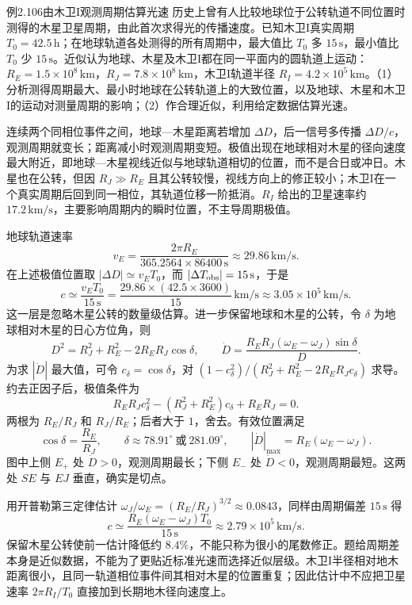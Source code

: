 \KinematicKeepSpace{14cm}
\begin{origexamplebox}{例2.106\quad 由木卫I观测周期估算光速}
历史上曾有人比较地球位于公转轨道不同位置时测得的木星卫星周期，由此首次求得光的传播速度。已知木卫I真实周期 $T_0=42.5\,\mathrm h$；在地球轨道各处测得的所有周期中，最大值比 $T_0$ 多 $15\,\mathrm s$，最小值比 $T_0$ 少 $15\,\mathrm s$。近似认为地球、木星及木卫I都在同一平面内的圆轨道上运动：$R_E=1.5\times10^8\,\mathrm{km}$，$R_J=7.8\times10^8\,\mathrm{km}$，木卫I轨道半径 $R_I=4.2\times10^5\,\mathrm{km}$。（1）分析测得周期最大、最小时地球在公转轨道上的大致位置，以及地球、木星和木卫I的运动对测量周期的影响；（2）作合理近似，利用给定数据估算光速。
\end{origexamplebox}
\begin{xesolution}
连续两个同相位事件之间，地球—木星距离若增加 $\Delta D$，后一信号多传播 $\Delta D/c$，观测周期就变长；距离减小时观测周期变短。极值出现在地球相对木星的径向速度最大附近，即地球—木星视线近似与地球轨道相切的位置，而不是合日或冲日。木星也在公转，但因 $R_J\gg R_E$ 且其公转较慢，视线方向上的修正较小；木卫I在一个真实周期后回到同一相位，其轨道位移一阶抵消。$R_I$ 给出的卫星速率约 $17.2\,\mathrm{km/s}$，主要影响周期内的瞬时位置，不主导周期极值。
\RomerDiagram

地球轨道速率
\[
v_E=\frac{2\pi R_E}{365.2564\times86400\,\mathrm s}
\approx29.86\,\mathrm{km/s}.
\]
在上述极值位置取 $|\Delta D|\simeq v_ET_0$，而 $|\Delta T_{\rm obs}|=15\,\mathrm s$，于是
\[
c\simeq\frac{v_ET_0}{15\,\mathrm s}
=\frac{29.86\times(42.5\times3600)}{15}\,\mathrm{km/s}
\approx\boxed{3.05\times10^5\,\mathrm{km/s}}.
\]
这一层是忽略木星公转的数量级估算。进一步保留地球和木星的公转，令 $\delta$ 为地球相对木星的日心方位角，则
\[
D^2=R_J^2+R_E^2-2R_ER_J\cos\delta,\qquad
\dot D=\frac{R_ER_J(\omega_E-\omega_J)\sin\delta}{D}.
\]
为求 $|\dot D|$ 最大值，可令 $c_\delta=\cos\delta$，对 $(1-c_\delta^2)/(R_J^2+R_E^2-2R_ER_Jc_\delta)$ 求导。约去正因子后，极值条件为
\[
R_ER_Jc_\delta^2-(R_J^2+R_E^2)c_\delta+R_ER_J=0.
\]
两根为 $R_E/R_J$ 和 $R_J/R_E$；后者大于 $1$，舍去。有效位置满足
\[
\cos\delta=\frac{R_E}{R_J},\qquad
\delta\approx78.91^\circ\ \text{或}\ 281.09^\circ,
\qquad |\dot D|_{\max}=R_E(\omega_E-\omega_J).
\]
图中上侧 $E_+$ 处 $\dot D>0$，观测周期最长；下侧 $E_-$ 处 $\dot D<0$，观测周期最短。这两处 $SE$ 与 $EJ$ 垂直，确实是切点。

用开普勒第三定律估计 $\omega_J/\omega_E=(R_E/R_J)^{3/2}\approx0.0843$，同样由周期偏差 $15\,\mathrm s$ 得
\[
c\simeq\frac{R_E(\omega_E-\omega_J)T_0}{15\,\mathrm s}
\approx2.79\times10^5\,\mathrm{km/s}.
\]
保留木星公转使前一估计降低约 $8.4\%$，不能只称为很小的尾数修正。题给周期差本身是近似数据，不能为了更贴近标准光速而选择近似层级。木卫I半径相对地木距离很小，且同一轨道相位事件间其相对木星的位置重复；因此估计中不应把卫星速率 $2\pi R_I/T_0$ 直接加到长期地木径向速度上。
\end{xesolution}

